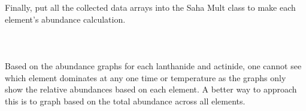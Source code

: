 \documentclass[11pt,a4paper]{article}
\begin{document}
Finally, put all the collected data arrays into the Saha Mult class to make each element's abundance calculation.
\\\\
\\\\
Based on the abundance graphs for each lanthanide and actinide, one cannot see which element dominates at any one time or temperature as the graphs only show the relative abundances based on each element. A better way to approach this is to graph based on the total abundance across all elements.
\end{document}
